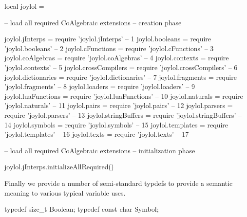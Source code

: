 \startLuaCode
local joylol = { }

-- load all required CoAlgebraic extensions -- creation phase

joylol.jInterps       = require 'joylol.jInterps'       --  1
joylol.booleans       = require 'joylol.booleans'       --  2
joylol.cFunctions     = require 'joylol.cFunctions'     --  3
joylol.coAlgebras     = require 'joylol.coAlgebras'     --  4
joylol.contexts       = require 'joylol.contexts'       --  5
joylol.crossCompilers = require 'joylol.crossCompilers' --  6
joylol.dictionaries   = require 'joylol.dictionaries'   --  7
joylol.fragments      = require 'joylol.fragments'      --  8
joylol.loaders        = require 'joylol.loaders'        --  9
joylol.luaFunctions   = require 'joylol.luaFunctions'   -- 10
joylol.naturals       = require 'joylol.naturals'       -- 11
joylol.pairs          = require 'joylol.pairs'          -- 12
joylol.parsers        = require 'joylol.parsers'        -- 13
joylol.stringBuffers  = require 'joylol.stringBuffers'  -- 14
joylol.symbols        = require 'joylol.symbols'        -- 15
joylol.templates      = require 'joylol.templates'      -- 16
joylol.texts          = require 'joylol.texts'          -- 17

-- load all required CoAlgebraic extensions -- initialization phase

joylol.jInterps.initializeAllRequired()

\stopLuaCode

Finally we provide a number of semi-standard typdefs to provide a semantic 
meaning to various typical variable uses. 

\startCHeader
typedef size_t     Boolean;
typedef const char Symbol;
\stopCHeader
